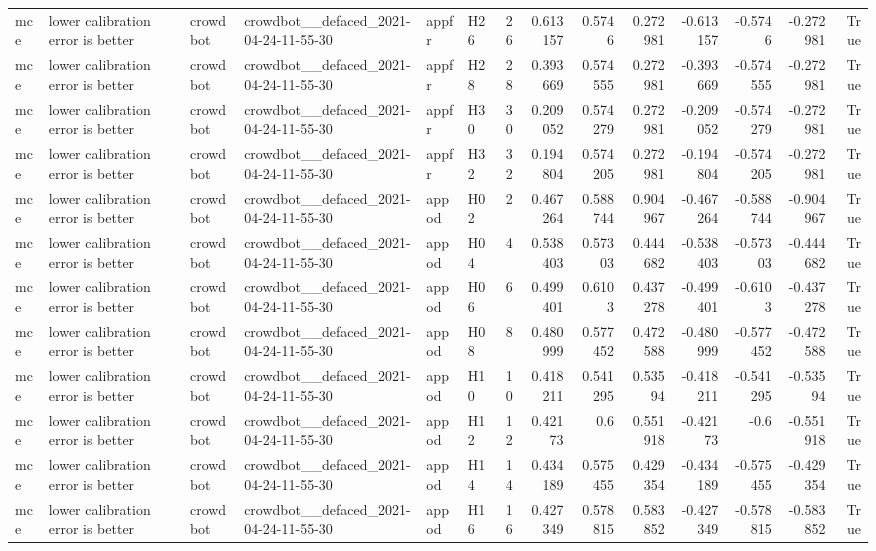 \begin{longtable}{llllllrrrrrrrr}
mce & lower calibration error is better & crowdbot & crowdbot\_\_defaced\_2021-04-24-11-55-30 & appfr & H26 & 26 & 0.613157 & 0.5746 & 0.272981 & -0.613157 & -0.5746 & -0.272981 & True \\
mce & lower calibration error is better & crowdbot & crowdbot\_\_defaced\_2021-04-24-11-55-30 & appfr & H28 & 28 & 0.393669 & 0.574555 & 0.272981 & -0.393669 & -0.574555 & -0.272981 & True \\
mce & lower calibration error is better & crowdbot & crowdbot\_\_defaced\_2021-04-24-11-55-30 & appfr & H30 & 30 & 0.209052 & 0.574279 & 0.272981 & -0.209052 & -0.574279 & -0.272981 & True \\
mce & lower calibration error is better & crowdbot & crowdbot\_\_defaced\_2021-04-24-11-55-30 & appfr & H32 & 32 & 0.194804 & 0.574205 & 0.272981 & -0.194804 & -0.574205 & -0.272981 & True \\
mce & lower calibration error is better & crowdbot & crowdbot\_\_defaced\_2021-04-24-11-55-30 & appod & H02 & 2 & 0.467264 & 0.588744 & 0.904967 & -0.467264 & -0.588744 & -0.904967 & True \\
mce & lower calibration error is better & crowdbot & crowdbot\_\_defaced\_2021-04-24-11-55-30 & appod & H04 & 4 & 0.538403 & 0.57303 & 0.444682 & -0.538403 & -0.57303 & -0.444682 & True \\
mce & lower calibration error is better & crowdbot & crowdbot\_\_defaced\_2021-04-24-11-55-30 & appod & H06 & 6 & 0.499401 & 0.6103 & 0.437278 & -0.499401 & -0.6103 & -0.437278 & True \\
mce & lower calibration error is better & crowdbot & crowdbot\_\_defaced\_2021-04-24-11-55-30 & appod & H08 & 8 & 0.480999 & 0.577452 & 0.472588 & -0.480999 & -0.577452 & -0.472588 & True \\
mce & lower calibration error is better & crowdbot & crowdbot\_\_defaced\_2021-04-24-11-55-30 & appod & H10 & 10 & 0.418211 & 0.541295 & 0.53594 & -0.418211 & -0.541295 & -0.53594 & True \\
mce & lower calibration error is better & crowdbot & crowdbot\_\_defaced\_2021-04-24-11-55-30 & appod & H12 & 12 & 0.42173 & 0.6 & 0.551918 & -0.42173 & -0.6 & -0.551918 & True \\
mce & lower calibration error is better & crowdbot & crowdbot\_\_defaced\_2021-04-24-11-55-30 & appod & H14 & 14 & 0.434189 & 0.575455 & 0.429354 & -0.434189 & -0.575455 & -0.429354 & True \\
mce & lower calibration error is better & crowdbot & crowdbot\_\_defaced\_2021-04-24-11-55-30 & appod & H16 & 16 & 0.427349 & 0.578815 & 0.583852 & -0.427349 & -0.578815 & -0.583852 & True \\

\end{longtable}
